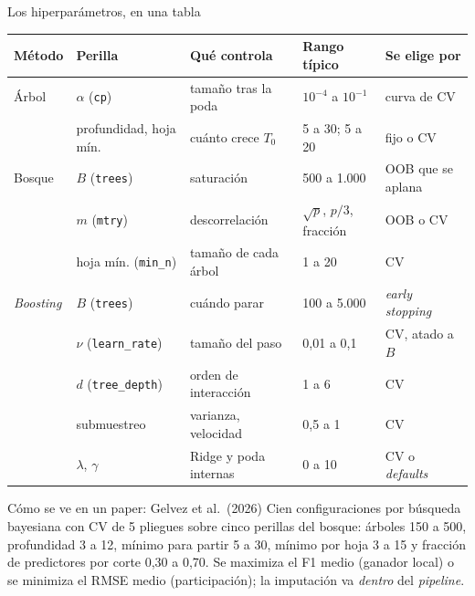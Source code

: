 \documentclass{beamer}
\newcommand{\1}{\mathbb{I}}
\begin{document}
\begin{frame}{Los hiperparámetros, en una tabla}
\small
\begin{center}
\scriptsize
\setlength{\tabcolsep}{2pt}
\renewcommand{\arraystretch}{1.1}
\begin{tabular}{llp{2.7cm}ll}
\hline
Método & Perilla & Qué controla & Rango típico & Se elige por \\
\hline
Árbol & $\alpha$ (\texttt{cp}) & tamaño tras la poda & $10^{-4}$ a $10^{-1}$ & curva de CV \\
 & profundidad, hoja mín. & cuánto crece $T_0$ & 5 a 30; 5 a 20 & fijo o CV \\
Bosque & $B$ (\texttt{trees}) & saturación & 500 a 1.000 & OOB que se aplana \\
 & $m$ (\texttt{mtry}) & descorrelación & $\sqrt{p}$, $p/3$, fracción & OOB o CV \\
 & hoja mín. (\texttt{min\_n}) & tamaño de cada árbol & 1 a 20 & CV \\
\emph{Boosting} & $B$ (\texttt{trees}) & cuándo parar & 100 a 5.000 & \emph{early stopping} \\
 & $\nu$ (\texttt{learn\_rate}) & tamaño del paso & 0,01 a 0,1 & CV, atado a $B$ \\
 & $d$ (\texttt{tree\_depth}) & orden de interacción & 1 a 6 & CV \\
 & submuestreo & varianza, velocidad & 0,5 a 1 & CV \\
 & $\lambda$, $\gamma$ & Ridge y poda internas & 0 a 10 & CV o \emph{defaults} \\
\hline
\end{tabular}
\end{center}
\pause
\begin{block}{Cómo se ve en un paper: Gelvez et al.\ (2026)}
Cien configuraciones por búsqueda bayesiana con CV de 5 pliegues sobre cinco perillas del bosque: árboles 150 a 500, profundidad 3 a 12, mínimo para partir 5 a 30, mínimo por hoja 3 a 15 y fracción de predictores por corte 0,30 a 0,70. Se maximiza el F1 medio (ganador local) o se minimiza el RMSE medio (participación); la imputación va \emph{dentro} del \emph{pipeline}.
\end{block}
\end{frame}
\end{document}
